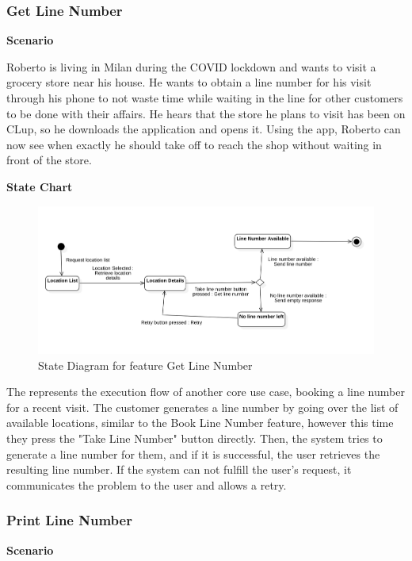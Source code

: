 \subsubsection{Get Line Number}

\textbf{Scenario}

Roberto is living in Milan during the COVID lockdown and wants to visit a grocery store near his house.
He wants to obtain a line number for his visit through his phone to not waste time while waiting in the line for other customers to be done with their affairs.
He hears that the store he plans to visit has been on CLup, so he downloads the application and opens it.
Using the app, Roberto can now see when exactly he should take off to reach the shop without waiting in front of the store.

\textbf{State Chart}

\begin{figure}[H]
    \centering
    \includegraphics[height=0.4\textwidth]{Images/StateCharts/GenerateLineNumber.png}
    \caption{State Diagram for feature Get Line Number}
    \label{fig:SDGetLine}
\end{figure}

The  represents the execution flow of another core use case, booking a line number for a recent visit.
The customer generates a line number by going over the list of available locations, similar to the Book Line Number feature, however this time they press the "Take Line Number" button directly.
Then, the system tries to generate a line number for them, and if it is successful, the user retrieves the resulting line number.
If the system can not fulfill the user's request, it communicates the problem to the user and allows a retry.

\subsubsection{Print Line Number}

\textbf{Scenario}

